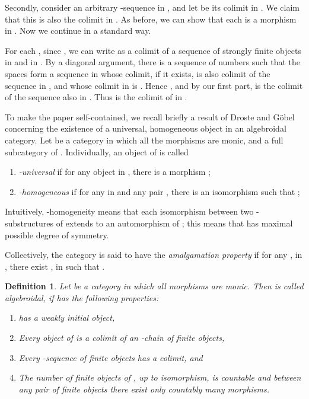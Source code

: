 \documentclass{LMCS}
\let\epf\endproof
\newtheorem{defn}{Definition}[section]
\begin{document}
Secondly, consider an arbitrary -sequence  in , and let
 be its colimit
in . We claim that this is also the colimit in
. As before, we can show that each  is a morphism in . Now we
continue in a standard way. 

For each , since ,
we can write  as a colimit of a sequence of strongly
finite objects  in  and in
. By a diagonal argument, there is a sequence of numbers
 such that the spaces  form a sequence in  whose colimit, if it
exists, is also colimit of the sequence  in , and whose colimit in  is
. Hence , and by our
first part,  is the colimit of the sequence
 also in . Thus
 is the colimit of 
in .  \epf

To make the paper self-contained, we recall briefly a
result of Droste and G\"{o}bel~\cite{droste1} concerning the existence of a universal,
homogeneous object in an algebroidal category. 
Let   be a  category  in which   all the morphisms   are  monic,
and  a full subcategory of .   Individually, an object 
of  is called
\begin{enumerate}[]
\item {\em -universal} if
for any object  in , there is a morphism ;
\item  {\em -homogeneous}  if for any
 in   and any pair  ,
there is an  isomorphism 
such that ;
\end{enumerate}

Intuitively, -homogeneity means that each isomorphism
between two -substructures of  extends to an
automorphism of ; this means that  has maximal possible degree
of symmetry. 

Collectively, the category   is said to have the
{\em amalgamation property} if for any ,  in , there exist ,  in
 such that . 


\begin{defn}
  Let  be a category in which all morphisms are monic. 
  Then  is called \emph{algebroidal}, if  has
  the following properties:

\begin{enumerate}[(1)]
\item  has a weakly initial object,
\item Every object of  is a colimit of an -chain of
finite objects,
\item Every -sequence of finite objects has a colimit, and
\item The number of finite objects of , up to isomorphism,
  is countable and between any pair of finite objects there exist only
  countably many morphisms. 
\end{enumerate}

\end{defn}
\end{document}
